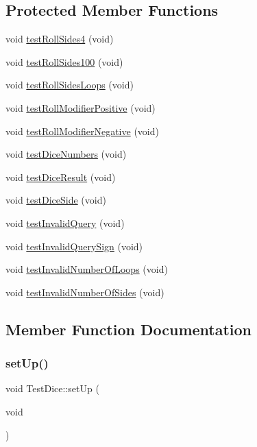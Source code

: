 \subsection*{Protected Member Functions}
\begin{DoxyCompactItemize}
\item 
void \hyperlink{class_test_dice_ae621d5b78bffd9b5a52cce4d9177aa2f}{test\+Roll\+Sides4} (void)
\item 
void \hyperlink{class_test_dice_a6117f3360b40fadea30354440019948a}{test\+Roll\+Sides100} (void)
\item 
void \hyperlink{class_test_dice_ab54f699e2f2d4f00356ff8e7fb70cff2}{test\+Roll\+Sides\+Loops} (void)
\item 
void \hyperlink{class_test_dice_a0e72b077dd7809a8477f769ee6183232}{test\+Roll\+Modifier\+Positive} (void)
\item 
void \hyperlink{class_test_dice_a4abec357f77e11c1bf199efc0863ffeb}{test\+Roll\+Modifier\+Negative} (void)
\item 
void \hyperlink{class_test_dice_a4d859f50f9c34b68557d2f78d924de65}{test\+Dice\+Numbers} (void)
\item 
void \hyperlink{class_test_dice_a6b0079bc572dd67e553f13d7015e8b0f}{test\+Dice\+Result} (void)
\item 
void \hyperlink{class_test_dice_a205145e759d361c35ad0c5c5056a76f8}{test\+Dice\+Side} (void)
\item 
void \hyperlink{class_test_dice_ac550d1791d8723fb56ec25f59d5dfa51}{test\+Invalid\+Query} (void)
\item 
void \hyperlink{class_test_dice_a4bc687597fc6bcf0d7bbc184c9250c56}{test\+Invalid\+Query\+Sign} (void)
\item 
void \hyperlink{class_test_dice_a32c88d603100adb9592371f2e75a2f9f}{test\+Invalid\+Number\+Of\+Loops} (void)
\item 
void \hyperlink{class_test_dice_a375bfdde3e13caf2116f3ca25fd7af4c}{test\+Invalid\+Number\+Of\+Sides} (void)
\end{DoxyCompactItemize}


\subsection{Member Function Documentation}
\hypertarget{class_test_dice_ab667ce059357171f1d8518c052e50f64}{}\label{class_test_dice_ab667ce059357171f1d8518c052e50f64} 
\subsubsection{\texorpdfstring{set\+Up()}{setUp()}}
{\footnotesize\ttfamily void Test\+Dice\+::set\+Up (\begin{DoxyParamCaption}\item[{void}]{ }\end{DoxyParamCaption})}

